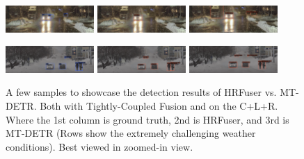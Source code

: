 \documentclass[report.tex]{subfiles}
\begin{document}
\begin{figure}[h!]
        \includegraphics[width=0.3\textwidth]{images/results/hrfuser_vs_mtdetr/samples/snow_4/2019-01-09_18-39-19_00300.png}
        \includegraphics[width=0.3\textwidth]{images/results/hrfuser_vs_mtdetr/samples/snow_4/2019-01-09_18-39-19_00300_former.png}
        \includegraphics[width=0.3\textwidth]{images/results/hrfuser_vs_mtdetr/samples/snow_4/2019-01-09_18-39-19_00300_m_cropped.png}

        \includegraphics[width=0.3\textwidth]{images/results/hrfuser_vs_mtdetr/samples/snow_day/2018-02-12_10-07-06_00200.png}
        \includegraphics[width=0.3\textwidth]{images/results/hrfuser_vs_mtdetr/samples/snow_day/2018-02-12_10-07-06_00200_former.png}
        \includegraphics[width=0.3\textwidth]{images/results/hrfuser_vs_mtdetr/samples/snow_day/2018-02-12_10-07-06_00200_m_cropped.png}
        
      
        \caption{A few samples to showcase the detection results of HRFuser vs. MT-DETR. Both with Tightly-Coupled Fusion and on the C+L+R. Where the 1st column is ground truth, 2nd is HRFuser, and 3rd is MT-DETR (Rows show the extremely challenging weather conditions). Best viewed in zoomed-in view.}
        \label{fig:hrfuser_vs_mtdetr_on_dense}
      \end{figure}


    
\end{document}
